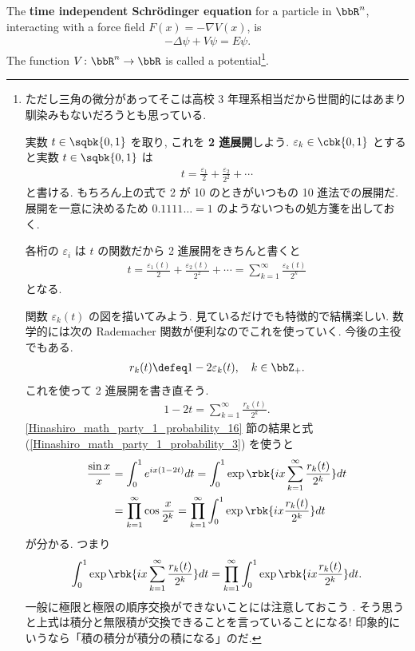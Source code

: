 \documentclass[openany, a4paper, oneside]{jsbook}
\begin{document}
The \textbf{time independent Schr\"odinger equation} for a particle in $\bbR^n$, interacting with a force field $F (x) = - \nabla V (x)$, is
\begin{align}
 -\Delta \psi + V \psi = E \psi. \label{Lieb-Loss_Analysis_chap11_1}
\end{align}
The function $V \colon \bbR^n \to \bbR$ is called a potential\footnote{ただし三角の微分があってそこは高校 3 年理系相当だから世間的にはあまり馴染みもないだろうとも思っている.

実数 $t \in \sqbk{0, 1}$ を取り, これを \textbf{2 進展開}しよう.
$\varepsilon_k \in \cbk{0, 1}$ とすると実数 $t \in \sqbk{0, 1}$ は
\begin{align}
 t
 =
 \frac{\varepsilon_1}{2} + \frac{\varepsilon_2}{2^2} + \cdots
\end{align}
と書ける.
もちろん上の式で 2 が 10 のときがいつもの 10 進法での展開だ.
展開を一意に決めるため $0.1111 \dots = 1$ のようないつもの処方箋を出しておく.

各桁の $\varepsilon_i$ は $t$ の関数だから 2 進展開をきちんと書くと
\begin{align}
 t
 =
 \frac{\varepsilon_1 (t)}{2} + \frac{\varepsilon_2 (t)}{2^2} + \cdots
 =
 \sum_{k=1}^{\infty} \frac{\varepsilon_k (t)}{2^k}
\end{align}
となる.

関数 $\varepsilon_k (t)$ の図を描いてみよう.
見ているだけでも特徴的で結構楽しい.
数学的には次の Rademacher 関数が便利なのでこれを使っていく.
今後の主役でもある.
\begin{align}
 r_k (t)
 \defeq
 1 - 2 \varepsilon_k (t), \quad k \in \bbZ_+. \label{Hinashiro_math_party_1_probability_4}
\end{align}
これを使って 2 進展開を書き直そう.
\begin{align}
 1 - 2 t
 =
 \sum_{k=1}^{\infty} \frac{r_k (t)}{2^k}. \label{Hinashiro_math_party_1_probability_19}
\end{align}
\ref{Hinashiro_math_party_1_probability_16} 節の結果と式 (\ref{Hinashiro_math_party_1_probability_3}) を使うと
\begin{align}
 \frac{\sin x}{x}
 &=
 \int_{0}^1 e^{ix (1 - 2t)} dt
 =
 \int_{0}^1 \exp \rbk{ix \sum_{k=1}^{\infty} \frac{r_k (t)}{2^k}} dt \\
 &=
 \prod_{k=1}^{\infty} \cos \frac{x}{2^{k}}
 =
 \prod_{k=1}^{\infty} \int_0^1 \exp \rbk{i x \frac{r_k (t)}{2^k}} dt \label{Hinashiro_math_party_1_probability_5}
\end{align}
が分かる.
つまり
\begin{align}
 \int_{0}^1 \exp \rbk{ix \sum_{k=1}^{\infty} \frac{r_k (t)}{2^k}} dt
 =
 \prod_{k=1}^{\infty} \int_0^1 \exp \rbk{i x \frac{r_k (t)}{2^k}} dt.
\end{align}
一般に極限と極限の順序交換ができないことには注意しておこう \footnotemark.
そう思うと上式は積分と無限積が交換できることを言っていることになる!
印象的にいうなら「積の積分が積分の積になる」のだ.}.
\end{document}
